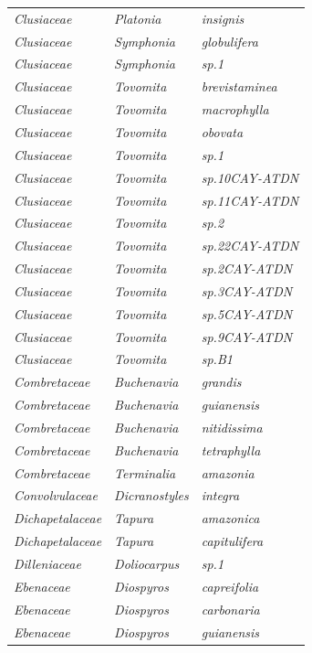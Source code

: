 \documentclass[fleqn,10pt]{ArtEcoFoG} %
\begin{document}
\begin{table}[t]
\begin{tabular}{lll}
\em{Clusiaceae} & \em{Platonia} & \em{insignis}\\
\addlinespace
\em{Clusiaceae} & \em{Symphonia} & \em{globulifera}\\
\em{Clusiaceae} & \em{Symphonia} & \em{sp.1}\\
\em{Clusiaceae} & \em{Tovomita} & \em{brevistaminea}\\
\em{Clusiaceae} & \em{Tovomita} & \em{macrophylla}\\
\em{Clusiaceae} & \em{Tovomita} & \em{obovata}\\
\addlinespace
\em{Clusiaceae} & \em{Tovomita} & \em{sp.1}\\
\em{Clusiaceae} & \em{Tovomita} & \em{sp.10CAY-ATDN}\\
\em{Clusiaceae} & \em{Tovomita} & \em{sp.11CAY-ATDN}\\
\em{Clusiaceae} & \em{Tovomita} & \em{sp.2}\\
\em{Clusiaceae} & \em{Tovomita} & \em{sp.22CAY-ATDN}\\
\addlinespace
\em{Clusiaceae} & \em{Tovomita} & \em{sp.2CAY-ATDN}\\
\em{Clusiaceae} & \em{Tovomita} & \em{sp.3CAY-ATDN}\\
\em{Clusiaceae} & \em{Tovomita} & \em{sp.5CAY-ATDN}\\
\em{Clusiaceae} & \em{Tovomita} & \em{sp.9CAY-ATDN}\\
\em{Clusiaceae} & \em{Tovomita} & \em{sp.B1}\\
\addlinespace
\em{Combretaceae} & \em{Buchenavia} & \em{grandis}\\
\em{Combretaceae} & \em{Buchenavia} & \em{guianensis}\\
\em{Combretaceae} & \em{Buchenavia} & \em{nitidissima}\\
\em{Combretaceae} & \em{Buchenavia} & \em{tetraphylla}\\
\em{Combretaceae} & \em{Terminalia} & \em{amazonia}\\
\addlinespace
\em{Convolvulaceae} & \em{Dicranostyles} & \em{integra}\\
\em{Dichapetalaceae} & \em{Tapura} & \em{amazonica}\\
\em{Dichapetalaceae} & \em{Tapura} & \em{capitulifera}\\
\em{Dilleniaceae} & \em{Doliocarpus} & \em{sp.1}\\
\em{Ebenaceae} & \em{Diospyros} & \em{capreifolia}\\
\addlinespace
\em{Ebenaceae} & \em{Diospyros} & \em{carbonaria}\\
\em{Ebenaceae} & \em{Diospyros} & \em{guianensis}\\

\end{tabular}
\end{table}
\end{document}
